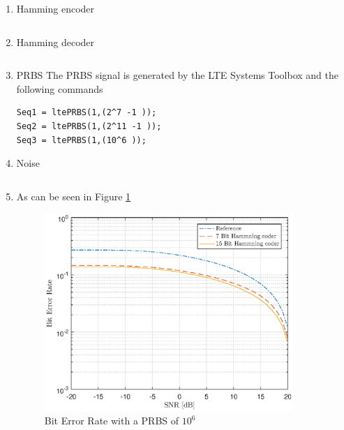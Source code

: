 \documentclass[12pt]{article}
\begin{document}
\vspace{-10cm}
\maketitle
\begin{enumerate}

\item Hamming encoder

\inputminted{matlab}{DataEncoder.m}
    
    \clearpage
\item Hamming decoder


\inputminted{matlab}{DataDecoder.m}

\item PRBS
The PRBS signal is generated by the LTE Systems Toolbox and the following commands
\begin{verbatim}
Seq1 = ltePRBS(1,(2^7 -1 ));
Seq2 = ltePRBS(1,(2^11 -1 ));
Seq3 = ltePRBS(1,(10^6 ));
\end{verbatim}

\clearpage
\item Noise


\inputminted{matlab}{Noise.m}
\clearpage

\item As can be seen in Figure \ref{fig:seq3}
\begin{figure}[H]
    \centering
    \includegraphics[height=7.5cm]{PlotSeq3.eps}
    \caption{Bit Error Rate with a PRBS of $10^6$}
    \label{fig:seq3}
\end{figure}


\end{enumerate}
\end{document}
